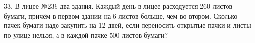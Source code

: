 33. В лицее №239 два здания. Каждый день в лицее расходуется 260 листов бумаги, причём в первом здании на 6 листов больше, чем во втором. Сколько пачек бумаги надо закупить на 12 дней, если переносить открытые пачки и листы по улице нельзя, а в каждой пачке 500 листов бумаги?\\
